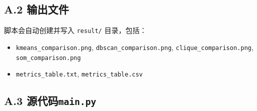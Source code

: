 \documentclass[runningheads]{ctexart}
\begin{document}
\subsection*{A.2 输出文件}
脚本会自动创建并写入 \texttt{result/} 目录，包括：
\begin{itemize}
	\item \texttt{kmeans\_comparison.png}, \texttt{dbscan\_comparison.png}, \texttt{clique\_comparison.png}, \texttt{som\_comparison.png}
	\item \texttt{metrics\_table.txt}, \texttt{metrics\_table.csv}
\end{itemize}

\subsection*{A.3 源代码\texttt{main.py}}
\end{document}
